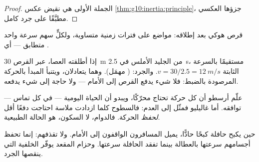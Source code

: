 \begin{proof}
الجملة الأولى هي نقيض عكس
\cref{thm:g10:inertia:principle}،  جزؤها العكسي مطبَّقًا
على جرد كامل.
\end{proof}

\begin{omfigure}

{\small قرص هوكي بعد إطلاقه: مواضع على فترات زمنية متساوية،
ولكلٍّ سهم سرعة واحد متطابق --- أي .}
\end{omfigure}

\begin{example}\label{ex:g10:inertia:puck}
إذا أطلقته العصا، عبر القرص \qty{30}{m} من الجليد الأملس في
\qty{2.5}{s}، مستقيمًا بالسرعة الثابتة $v = 30/2.5 = \qty{12}{m/s}$.
والجرد:   ( مهمَل). وهما
يتعادلان، ويتنبأ المبدأ بالحركة المرصودة بالضبط:
فلا شيء يدفع القرص إلى الأمام --- ولا حاجة إلى شيء يدفعه.
\end{example}

\begin{remark}
علّم أرسطو أن كل حركة تحتاج محرّكًا، ويبدو أن الحياة اليومية ---
 في كل تماس --- توافقه. أما غاليليو فمثّل 
إلى العدم: فالسطوح كلما ازدادت ملاسة احتاجت دفعًا أقل
\emph{لحفظ} الحركة. فالدوام، لا السكون، هو الحالة الطبيعية.
\end{remark}

\begin{remark}
حين يكبح حافلة كبحًا حادًّا، يميل المسافرون الواقفون إلى الأمام. ولا 
تقذفهم: إنما تحفظ أجسامهم سرعتها بالعطالة بينما تفقد الحافلة
سرعتها. وحزام المقعد يوفّر  الخلفية التي ينقصها الجرد.
\end{remark}

